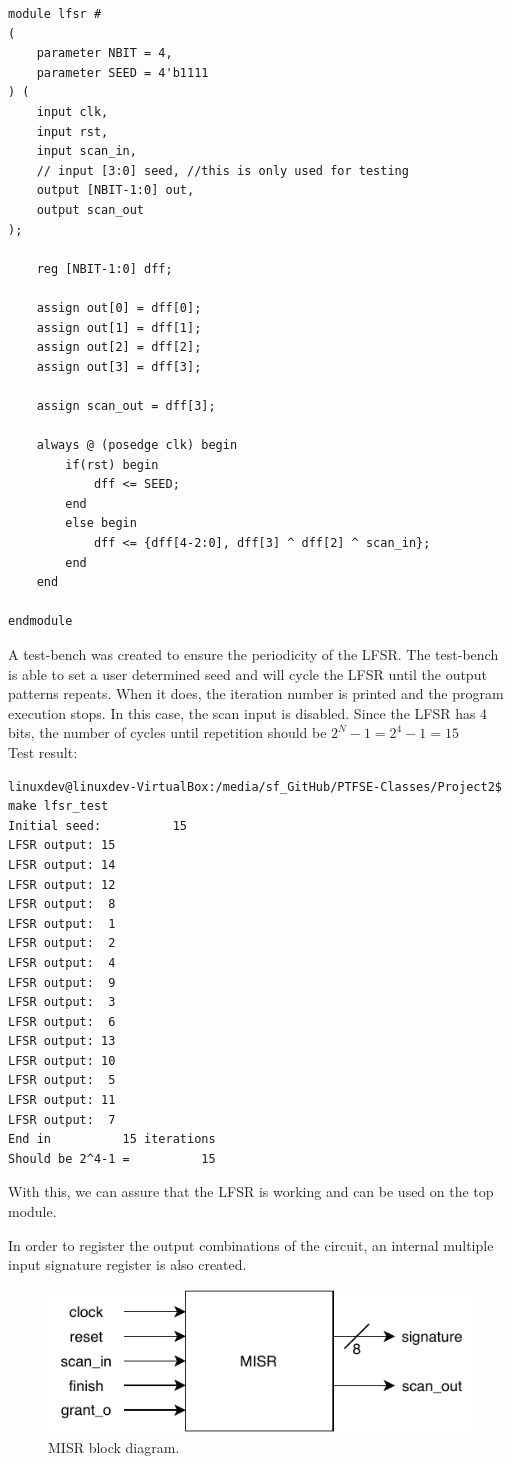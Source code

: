 \documentclass[12pt]{article}
\begin{document}
    \begin{lstlisting}[caption={LFSR code.},captionpos=b]
module lfsr #
(   
    parameter NBIT = 4,
    parameter SEED = 4'b1111
) (
    input clk,
    input rst,
    input scan_in,
    // input [3:0] seed, //this is only used for testing
    output [NBIT-1:0] out,
    output scan_out
);

    reg [NBIT-1:0] dff;

    assign out[0] = dff[0];
    assign out[1] = dff[1];
    assign out[2] = dff[2];
    assign out[3] = dff[3];
    
    assign scan_out = dff[3];

    always @ (posedge clk) begin
        if(rst) begin
            dff <= SEED;
        end
        else begin
            dff <= {dff[4-2:0], dff[3] ^ dff[2] ^ scan_in};
        end
    end

endmodule
    \end{lstlisting}
    
    A test-bench was created to ensure the periodicity of the LFSR. The test-bench is able to set a user determined seed and will cycle the LFSR until the output patterns repeats. When it does, the iteration number is printed and the program execution stops. In this case, the scan input is disabled. Since the LFSR has 4 bits, the number of cycles until repetition should be $2^{N}-1 = 2^{4}-1= 15$\\
    Test result:
        
        \begin{lstlisting}[caption={LFSR test-bench.},captionpos=b]
linuxdev@linuxdev-VirtualBox:/media/sf_GitHub/PTFSE-Classes/Project2$ make lfsr_test
Initial seed:          15
LFSR output: 15
LFSR output: 14
LFSR output: 12
LFSR output:  8
LFSR output:  1
LFSR output:  2
LFSR output:  4
LFSR output:  9
LFSR output:  3
LFSR output:  6
LFSR output: 13
LFSR output: 10
LFSR output:  5
LFSR output: 11
LFSR output:  7
End in          15 iterations
Should be 2^4-1 =          15
    \end{lstlisting}

With this, we can assure that the LFSR is working and can be used on the top module.\\
\newpage
    
In order to register the output combinations of the circuit, an internal multiple input signature register is also created. 

\begin{figure}[!htb]
        \centering
        \includegraphics[scale=1]{images/MISR.pdf}
            \caption{MISR block diagram.}
            \label{fig:misrbd}
    \end{figure}
\end{document}
